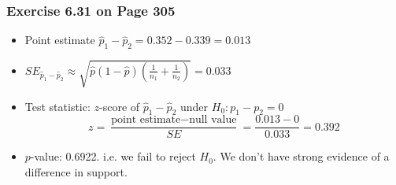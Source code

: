 \documentclass[handout]{beamer}
\newcommand{\phat}{\widehat{p}}
\begin{document}
\begin{frame}[fragile]
\frametitle{Exercise 6.31 on Page 305}

%
%
\begin{itemize}
\item Point estimate $\phat_1-\phat_2 = 0.352 - 0.339 = 0.013$
\pause \item $SE_{\phat_1 - \phat_2} \approx \sqrt{\widehat{p}(1-\widehat{p})\left(\frac{1}{n_1} + \frac{1}{n_2}\right)} =
0.033$
\pause \item Test statistic:  $z$-score of $\phat_1-\phat_2$ under $H_0:  p_1-p_2=0$
\[
z= \frac{\mbox{point estimate} - \mbox{null value}}{SE} = \frac{0.013-0}{0.033} = 0.392
\]
\pause \item $p$-value:  0.6922.  i.e. we fail to reject $H_0$.  We don't have strong evidence of a difference in support.
\end{itemize}

\end{frame}


%
%
%
%
%
%
\end{document}
